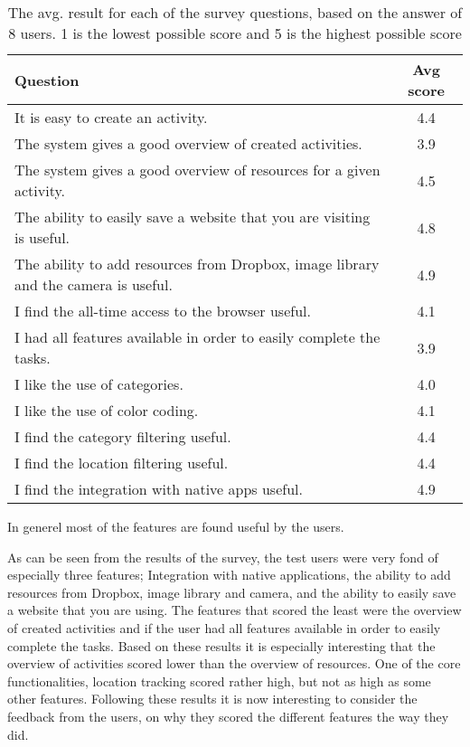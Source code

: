 \begin{table}[ht]
\begin{center}
    \begin{tabular}{ | p{7cm} | c |}
    \hline
    \textbf{Question} & \textbf{Avg score} \\ \hline
    	It is easy to create an activity. & 4.4 \\ \hline
		The system gives a good overview of created activities. & 3.9 \\ \hline
		The system gives a good overview of resources for a given activity. & 4.5 \\ \hline
		The ability to easily save a website that you are visiting is useful. & 4.8 \\ \hline
		The ability to add resources from Dropbox, image library and the camera is useful. & 4.9 \\ \hline
		I find the all-time access to the browser useful. & 4.1 \\ \hline
		I had all features available in order to easily complete the tasks. & 3.9 \\ \hline
		I like the use of categories. & 4.0 \\ \hline
		I like the use of color coding. & 4.1 \\ \hline
		I find the category filtering useful. & 4.4 \\ \hline
		I find the location filtering useful. & 4.4 \\ \hline
		I find the integration with native apps useful. & 4.9 \\ \hline
	\end{tabular}
\end{center}
\caption{The avg. result for each of the survey questions, based on the answer of 8 users. 1 is the lowest possible score and 5 is the highest possible score}
\label{table:quantitativeResult}
\end{table}

In generel most of the features are found useful by the users.

As can be seen from the results of the survey, the test users were very fond of especially three features; Integration with native applications, the ability to add resources from Dropbox, image library and camera, and the ability to easily save a website that you are using. The features that scored the least were the overview of created activities and if the user had all features available in order to easily complete the tasks. Based on these results it is especially interesting that the overview of activities scored lower than the overview of resources. One of the core functionalities, location tracking scored rather high, but not as high as some other features. Following these results it is now interesting to consider the feedback from the users, on why they scored the different features the way they did.

